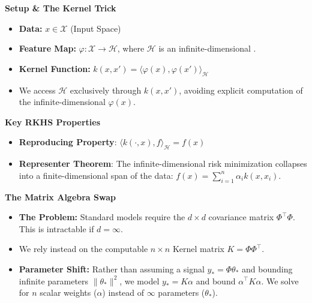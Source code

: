 \documentclass[
11pt,notheorems,hyperref={pdfauthor=whatever}
]{beamer}
\begin{document}
\begin{frame}
    \textbf{Setup \& The Kernel Trick}
    \begin{itemize}
        \item \textbf{Data:} \(x \in \mathcal{X}\) (Input Space)
        \item \textbf{Feature Map:} \(\varphi: \mathcal{X} \rightarrow \mathcal{H}\), where \(\mathcal{H}\) is an infinite-dimensional .
        \item \textbf{Kernel Function:} \(k(x, x') = \langle \varphi(x), \varphi(x') \rangle_{\mathcal{H}}\)
        \item We access \(\mathcal{H}\) exclusively through \(k(x, x')\), avoiding explicit computation of the infinite-dimensional \(\varphi(x)\).
    \end{itemize}
    
    \vspace{0.3cm}
    \textbf{Key RKHS Properties}
    \begin{itemize}
        \item \alert{\textbf{Reproducing Property}}: \(\langle k(\cdot, x), f \rangle_{\mathcal{H}} = f(x)\)
        \item \alert{\textbf{Representer Theorem}}: The infinite-dimensional risk minimization collapses into a finite-dimensional span of the data: \(f(x) = \sum_{i=1}^n \alpha_i k(x, x_i)\).
    \end{itemize}

    \vspace{0.3cm}
    \textbf{The Matrix Algebra Swap}
    \begin{itemize}
        \item \alert{\textbf{The Problem:}} Standard models require the \(d \times d\) covariance matrix \(\Phi^\top\Phi\). This is intractable if \(d = \infty\).
        \item {} We rely instead on the computable \(n \times n\) Kernel matrix \(K = \Phi\Phi^\top\). 
        \item \alert{\textbf{Parameter Shift:}} Rather than assuming a signal \(y_* = \Phi\theta_*\) and bounding infinite parameters \(\|\theta_*\|^2\), we model \(y_* = K\alpha\) and bound \(\alpha^\top K \alpha\). We solve for \(n\) scalar weights (\(\alpha\)) instead of \(\infty\) parameters (\(\theta_*\)).
    \end{itemize}
\end{frame}
\end{document}
